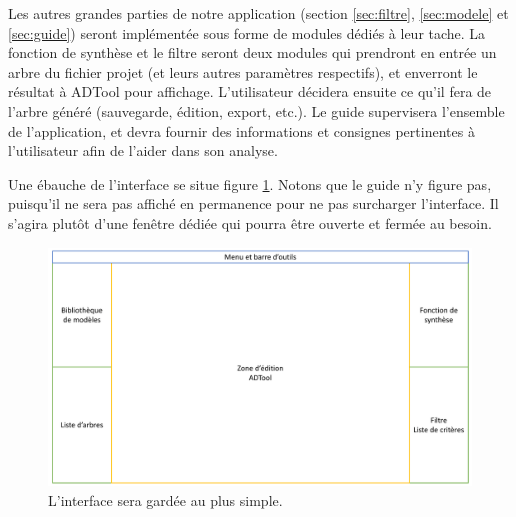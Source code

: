        Les autres grandes parties de notre application (section \ref{sec:filtre}, \ref{sec:modele} et \ref{sec:guide}) seront implémentée sous forme de modules dédiés à leur tache.
        La fonction de synthèse et le filtre seront deux modules qui prendront en entrée un arbre du fichier projet (et leurs autres paramètres respectifs), et enverront le résultat à ADTool pour affichage. L'utilisateur décidera ensuite ce qu'il fera de l'arbre généré (sauvegarde, édition, export, etc.).
        Le guide supervisera l'ensemble de l'application, et devra fournir des informations et consignes pertinentes à l'utilisateur afin de l'aider dans son analyse.

        Une ébauche de l'interface se situe figure \ref{fig:interface}. Notons que le guide n'y figure pas, puisqu'il ne sera pas affiché en permanence pour ne pas surcharger l'interface. Il s'agira plutôt d'une fenêtre dédiée qui pourra être ouverte et fermée au besoin.

        \begin{figure}
            \begin{center}
                \includegraphics[width=1\textwidth]{figure/interface.pdf}
            \end{center}
            \caption{L'interface sera gardée au plus simple.}
            \label{fig:interface}
        \end{figure}